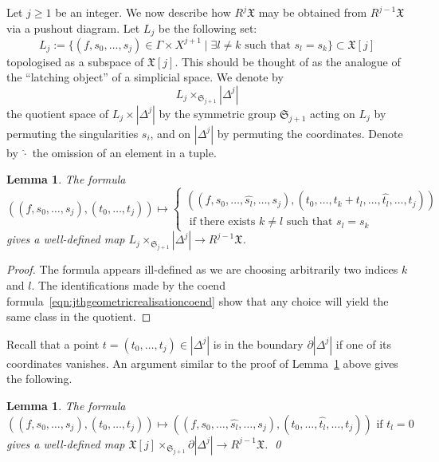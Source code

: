 \documentclass[a4paper]{amsart}
\newcommand{\fX}{\mathfrak X}
\newcommand{\fS}{\mathfrak S}
\theoremstyle{plain}
\newtheorem{lemma}[theorem]{Lemma}
\theoremstyle{definition}
\begin{document}
\bigskip

Let $j \geq 1$ be an integer. We now describe how $R^j\fX$ may be obtained from $R^{j-1}\fX$ via a pushout diagram. Let $L_j$ be the following set:
\begin{equation}\label{eqn:deflatchingobject}
    L_j := \{ (f,s_0, \ldots, s_j) \in \Gamma \times X^{j+1} \mid \exists l \neq k \text{ such that } s_l = s_k \} \subset \fX[j]
\end{equation}
topologised as a subspace of $\fX[j]$. This should be thought of as the analogue of the ``latching object'' of a simplicial space. We denote by 
\[
    L_j \times_{\fS_{j+1}} |\Delta^j|
\]
the quotient space of $L_j \times |\Delta^j|$ by the symmetric group $\fS_{j+1}$ acting on $L_j$ by permuting the singularities $s_i$, and on $|\Delta^j|$ by permuting the coordinates. Denote by $\widehat{\cdot}$ the omission of an element in a tuple.
\begin{lemma}\label{lemma:smallwelldefinedmap}
The formula
\[
    \left( (f,s_0,\ldots,s_j), (t_0, \ldots, t_j) \right) \longmapsto 
    \begin{cases} \left( (f,s_0,\ldots,\widehat{s_l},\ldots,s_j), (t_0, \ldots, t_k + t_l, \ldots, \widehat{t_l}, \ldots, t_j) \right) \\
     \text{ if there exists $k \neq l$ such that $s_l = s_k$ } \end{cases}
\]
gives a well-defined map $L_j \times_{\fS_{j+1}} |\Delta^j| \to R^{j-1}\fX$.
\end{lemma}
\begin{proof}
The formula appears ill-defined as we are choosing arbitrarily two indices $k$ and $l$. The identifications made by the coend formula~\eqref{eqn:jthgeometricrealisationcoend} show that any choice will yield the same class in the quotient.
\end{proof}
Recall that a point $t = (t_0, \ldots, t_j) \in |\Delta^j|$ is in the boundary $\partial |\Delta^j|$ if one of its coordinates vanishes. An argument similar to the proof of Lemma~\ref{lemma:smallwelldefinedmap} above gives the following.
\begin{lemma}\label{lemma:secondsmallwelldefinedmap}
The formula
\[
    \left( (f,s_0,\ldots,s_j), (t_0, \ldots, t_j) \right) \longmapsto 
    \left( (f,s_0,\ldots,\widehat{s_l},\ldots,s_j), (t_0, \ldots, \widehat{t_l}, \ldots, t_j) \right)
     \text{ if $t_l = 0$ }
\]
gives a well-defined map $\fX[j] \times_{\fS_{j+1}} \partial |\Delta^j| \to R^{j-1}\fX$. \qed
\end{lemma}
\end{document}
